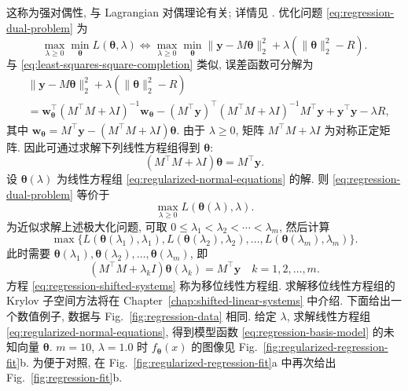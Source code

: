 {这称为强对偶性, 与 Lagrangian 对偶理论有关; 详情见 . 优化问题 \eqref{eq:regression-dual-problem} 为}
\begin{equation}\label{eq:regularized-regression-dual}
\max_{\lambda\ge0}\min_{\boldsymbol{\theta}}L(\boldsymbol{\theta},\lambda)\Leftrightarrow
\max_{\lambda\ge0}\min_{\boldsymbol{\theta}}\|\boldsymbol{y}-M\boldsymbol{\theta}\|_2^2+\lambda(\|\boldsymbol{\theta}\|_2^2-R).
\end{equation}
{与 \eqref{eq:least-squares-square-completion} 类似, 误差函数可分解为}
\[\begin{aligned}
&\|\boldsymbol{y}-M\boldsymbol{\theta}\|_2^2+\lambda(\|\boldsymbol{\theta}\|_2^2-R)\\
&=\boldsymbol{w}_{\boldsymbol{\theta}}^{\top}(M^{\top}M+\lambda I)^{-1}\boldsymbol{w}_{\boldsymbol{\theta}}-(M^{\top}\boldsymbol{y})^{\top}(M^{\top}M+\lambda I)^{-1}M^{\top}\boldsymbol{y}+\boldsymbol{y}^{\top}\boldsymbol{y}-\lambda R,
\end{aligned}\]
{其中 $\boldsymbol{w}_{\boldsymbol{\theta}}=M^{\top}\boldsymbol{y}-(M^{\top}M+\lambda I)\boldsymbol{\theta}$. 由于 $\lambda\ge0$, 矩阵 $M^{\top}M+\lambda I$ 为对称正定矩阵. 因此可通过求解下列线性方程组得到 $\boldsymbol{\theta}$:}
\begin{equation}\label{eq:regularized-normal-equations}
(M^{\top}M+\lambda I)\boldsymbol{\theta}=M^{\top}\boldsymbol{y}.
\end{equation}
{设 $\boldsymbol{\theta}(\lambda)$ 为线性方程组 \eqref{eq:regularized-normal-equations} 的解. 则 \eqref{eq:regression-dual-problem} 等价于}
\[\max_{\lambda\ge0}L(\boldsymbol{\theta}(\lambda),\lambda).\]
{为近似求解上述极大化问题, 可取 $0\le\lambda_1<\lambda_2<\cdots<\lambda_m$, 然后计算}
\[\max\{L(\boldsymbol{\theta}(\lambda_1),\lambda_1),L(\boldsymbol{\theta}(\lambda_2),\lambda_2),\ldots,L(\boldsymbol{\theta}(\lambda_m),\lambda_m)\}.\]
{此时需要 $\boldsymbol{\theta}(\lambda_1),\boldsymbol{\theta}(\lambda_2),\ldots,\boldsymbol{\theta}(\lambda_m)$, 即}
\begin{equation}\label{eq:regression-shifted-systems}
(M^{\top}M+\lambda_k I)\boldsymbol{\theta}(\lambda_k)=M^{\top}\boldsymbol{y}\quad k=1,2,\ldots,m.
\end{equation}
{方程 \eqref{eq:regression-shifted-systems} 称为移位线性方程组. 求解移位线性方程组的 Krylov 子空间方法将在 Chapter\ \ref{chap:shifted-linear-systems} 中介绍.}
{下面给出一个数值例子, 数据与 Fig.\ \ref{fig:regression-data} 相同. 给定 $\lambda$, 求解线性方程组 \eqref{eq:regularized-normal-equations}, 得到模型函数 \eqref{eq:regression-basis-model} 的未知向量 $\boldsymbol{\theta}$. $m=10$, $\lambda=1.0$ 时 $f_{\boldsymbol{\theta}}(x)$ 的图像见 Fig.\ \ref{fig:regularized-regression-fit}b. 为便于对照, 在 Fig.\ \ref{fig:regularized-regression-fit}a 中再次给出 Fig.\ \ref{fig:regression-fit}b.}
